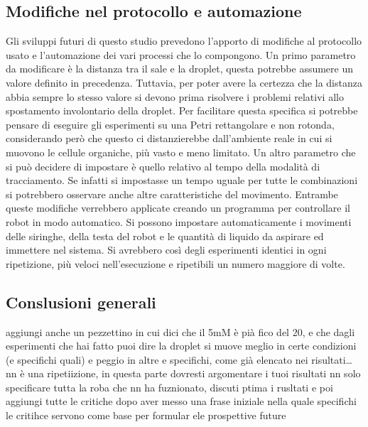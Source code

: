 \subsection{Modifiche nel protocollo e automazione}
Gli sviluppi futuri di questo studio prevedono l'apporto di modifiche al protocollo usato e l'automazione dei vari processi che lo compongono.
Un primo parametro da modificare è la distanza tra il sale e la droplet, questa potrebbe assumere un valore definito in precedenza. Tuttavia, per poter avere la certezza che la distanza abbia sempre lo stesso valore si devono prima risolvere i problemi relativi allo spostamento involontario della droplet. Per facilitare questa specifica si potrebbe pensare di eseguire gli esperimenti su una Petri rettangolare e non rotonda, considerando però che questo ci distanzierebbe dall'ambiente reale in cui si muovono le cellule organiche, più vasto e meno limitato. 
Un altro parametro che si può decidere di impostare è quello relativo al tempo della modalità di tracciamento. Se infatti si impostasse un tempo uguale per tutte le combinazioni si potrebbero osservare anche altre caratteristiche del movimento. 
Entrambe queste modifiche verrebbero applicate creando un programma per controllare il robot in modo automatico. Si possono impostare automaticamente i movimenti delle siringhe, della testa del robot e le quantità di liquido da aspirare ed immettere nel sistema. Si avrebbero così degli esperimenti identici in ogni ripetizione, più veloci nell'esecuzione e ripetibili un numero maggiore di volte.

\subsection{Conslusioni generali}

aggiungi anche un pezzettino in cui dici che il 5mM è pià fico del 20, e che dagli esperimenti che hai fatto puoi dire la droplet si muove meglio in certe condizioni (e specifichi quali) e peggio in altre e specifichi, come già elencato nei risultati… nn è una ripetiizione, in questa parte dovresti argomentare i tuoi risultati nn solo specificare tutta la roba che nn ha fuznionato, discuti ptima i rusltati e poi aggiungi tutte le critiche dopo aver messo una frase iniziale nella quale specifichi le critihce servono come base per formular ele prospettive future

